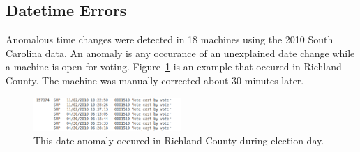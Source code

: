 \subsection{Datetime Errors}
Anomalous time changes were detected in 18 machines using the 2010 South
Carolina data.  An anomaly is any occurance of an unexplained date
change while a machine is open for voting. Figure~\ref{fig:Richland}
is an example that occured in Richland County.  The machine was manually
corrected about 30 minutes later. 
\begin{figure}[h!]
  \caption{This date anomaly occured in Richland County during election day.}
  \label{fig:Richland}
  \centering
    \includegraphics[width=0.5\textwidth]{datefig2.png}
\end{figure}


